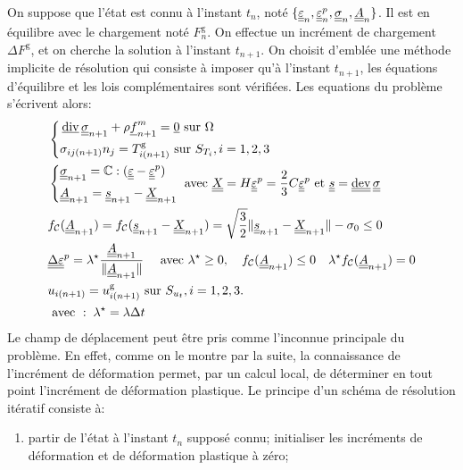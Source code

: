 \documentclass[10pt]{book}
\newcommand{\FthEpsp}{\ten{A}}
\begin{document}
\begin{appendices}
On suppose que l'état est connu à l'instant $t_{n}$, noté $\{\DefoHPP_{n},\DefoHPP_{n}^{p},\SC_{n},\FthEpsp_{n}\}$. Il est en équilibre avec le chargement noté $F_{n}^{\mathrm{g}}$. On effectue un incrément de chargement $\Delta F^{\mathrm{g}}$, et on cherche la solution à l'instant $t_{n+1}$. On choisit d'emblée une méthode implicite de résolution qui consiste à imposer qu'à l'instant $t_{n+1}$, les équations d'équilibre et les lois complémentaires sont vérifiées. Les equations du problème s'écrivent alors:
\begin{align}
&\left\{\begin{aligned}
&\vdiv\SC_{n+1}+\rho\FMass_{n+1}=\vec{0} \sur \Omega\\
&\sigma_{ij(n+1)}n_{j}=T_{i(n+1)}^{\mathrm{g}}\sur S_{T_{i}}, i=1, 2, 3\\	
\end{aligned}\right.\\\label{eq:loi_compo_increm_cin_lin}
&\left\{\begin{aligned}
&\SC_{n+1}=\RigiLin:(\DefoHPP-\EpsP)\\
&\FthEpsp_{n+1}=\devia_{n+1}-\CentreConv_{n+1}\\
\end{aligned} \right. \avec\CentreConv=H \DefoHPP^{p}=\frac{2}{3}C\EpsP\et \devia=\dev\SC\\\label{eq:Fonction_charge_incre}
&\FChargeConvexe(\FthEpsp_{n+1})=\FChargeConvexe(\devia_{n+1}-\CentreConv_{n+1})=\sqrt{\frac{3}{2}}\Vert \devia_{n+1}-\CentreConv_{n+1}\Vert-\sigma_{0}\leq0\\\label{eq:Ecoulement_incre}
&\DeltaDefoHPP^{p}=\lambda^{\star}\frac{\FthEpsp_{n+1}}{\Vert \FthEpsp_{n+1}\Vert} \quad \avec \lambda^{\star}\geq 0, \quad \FChargeConvexe(\FthEpsp_{n+1})\leq 0 \quad \lambda^{\star}\FChargeConvexe(\FthEpsp_{n+1})=0\\
&u_{i(n+1)}=u_{i(n+1)}^{\mathrm{g}} \sur S_{u_{t}}, i=1, 2, 3.\\
&\avec: \; \lambda^{\star}=\lambda\Delta t
\end{align}
Le champ de déplacement peut être pris comme l'inconnue principale du problème. En effet, comme on le montre par la suite, la connaissance de l'incrément de déformation permet, par un calcul local, de déterminer en tout point l'incrément de déformation plastique. Le principe d'un schéma de résolution itératif consiste à:
\begin{enumerate}
\item partir de l'état à l'instant $t_{n}$ supposé connu; initialiser les incréments de déformation et de déformation plastique à zéro;

\end{enumerate}
\end{appendices}
\end{document}
